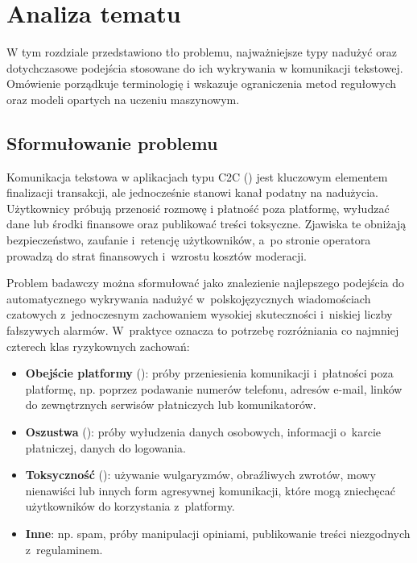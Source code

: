 \chapter{Analiza tematu}
\label{ch:analiza}


W tym rozdziale przedstawiono tło problemu, najważniejsze typy nadużyć oraz
dotychczasowe podejścia stosowane do ich wykrywania w komunikacji tekstowej.
Omówienie porządkuje terminologię i wskazuje ograniczenia metod regułowych
oraz modeli opartych na uczeniu maszynowym.


\section{Sformułowanie problemu}
\label{sec:problem}

Komunikacja tekstowa w aplikacjach typu C2C () jest
kluczowym elementem finalizacji transakcji, ale jednocześnie stanowi kanał podatny
na nadużycia. Użytkownicy próbują przenosić rozmowę i płatność poza platformę,
wyłudzać dane lub środki finansowe oraz publikować treści toksyczne. Zjawiska te
obniżają bezpieczeństwo, zaufanie i~retencję użytkowników, a~po stronie operatora
prowadzą do strat finansowych i~wzrostu kosztów moderacji.

Problem badawczy można sformułować jako znalezienie najlepszego podejścia do automatycznego wykrywania nadużyć
w~polskojęzycznych wiadomościach czatowych z~jednoczesnym zachowaniem wysokiej
skuteczności i~niskiej liczby fałszywych alarmów. W~praktyce oznacza to potrzebę
rozróżniania co najmniej czterech klas ryzykownych zachowań:

\begin{itemize}
\item \textbf{Obejście platformy} (): próby przeniesienia komunikacji i~płatności poza platformę, np. poprzez podawanie numerów telefonu, adresów e-mail, linków do zewnętrznych serwisów płatniczych lub komunikatorów.
\item \textbf{Oszustwa} (): próby wyłudzenia danych osobowych, informacji o~karcie płatniczej, danych do logowania.
\item \textbf{Toksyczność} (): używanie wulgaryzmów, obraźliwych zwrotów, mowy nienawiści lub innych form agresywnej komunikacji, które mogą zniechęcać użytkowników do korzystania z~platformy.
\item \textbf{Inne}: np. spam, próby manipulacji opiniami, publikowanie treści niezgodnych z~regulaminem.

\end{itemize}

